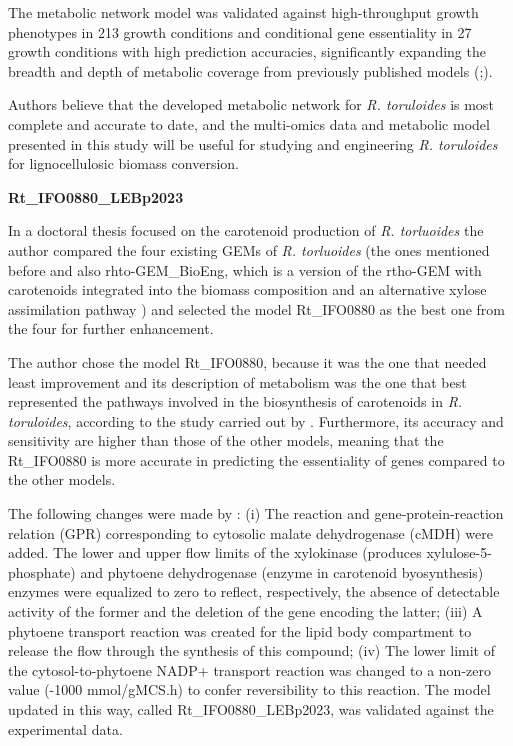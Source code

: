 The metabolic network model was validated against high-throughput growth phenotypes in 213 growth conditions and
conditional gene essentiality in 27 growth conditions with high
prediction accuracies, significantly expanding the breadth and
depth of metabolic coverage from previously published models
(\cite{Dinh2019};\cite{Tiukova2019}). \cite{Kim2021}

Authors believe that the
developed metabolic network for \textit{R. toruloides} is most complete
and accurate to date, and the multi-omics data and metabolic
model presented in this study will be useful for studying and
engineering \textit{R. toruloides} for lignocellulosic biomass conversion. \cite{Kim2021}


\textbf{Rt\_IFO0880\_LEBp2023}

 In a doctoral thesis focused on the carotenoid production of \textit{R. torluoides} \cite{DeBiaggi2023} the author compared the four existing GEMs 
 of \textit{R. torluoides} (the ones mentioned before and also rhto-GEM\_BioEng, 
 which is a version of the rtho-GEM with carotenoids integrated into the biomass composition and an alternative xylose assimilation pathway \cite{Pinheiro2020}) and selected the model 
 Rt\_IFO0880 as the best one from the four for further enhancement.

 The author chose the model Rt\_IFO0880, because it was the one
 that needed least improvement and its description of 
 metabolism was the one that best represented the pathways involved in the 
 biosynthesis of carotenoids in \textit{R. toruloides}, according to the study carried out by \cite{DeBiaggi2023}. 
Furthermore, its accuracy and sensitivity are higher than those of the other models, meaning that the Rt\_IFO0880 is more accurate in predicting 
the essentiality of genes compared to the other models. \cite{DeBiaggi2023}

The following changes were made by \cite{DeBiaggi2023}: (i) The reaction and gene-protein-reaction relation (GPR) corresponding to cytosolic malate dehydrogenase (cMDH) were added. The lower and upper 
flow limits of the xylokinase (produces xylulose-5-phosphate) and phytoene dehydrogenase (enzyme in carotenoid byosynthesis) enzymes were equalized to zero to reflect, respectively, 
the absence of detectable activity of the former and the deletion of the gene encoding the latter; 
(iii) A phytoene transport reaction was created for the lipid body compartment to release the flow through the synthesis of this compound; 
(iv) The lower limit of the cytosol-to-phytoene NADP+ transport reaction was changed to a non-zero value (-1000 mmol/gMCS.h) 
to confer reversibility to this reaction. The model updated in this way, called Rt\_IFO0880\_LEBp2023, 
was validated against the experimental data. \cite{DeBiaggi2023}

